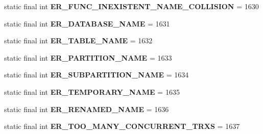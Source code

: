 \begin{DoxyCompactItemize}
static final int {\bfseries E\+R\+\_\+\+F\+U\+N\+C\+\_\+\+I\+N\+E\+X\+I\+S\+T\+E\+N\+T\+\_\+\+N\+A\+M\+E\+\_\+\+C\+O\+L\+L\+I\+S\+I\+ON} = 1630
\item 
\mbox{\label{classcom_1_1mysql_1_1jdbc_1_1_mysql_error_numbers_a9f1bcb88cc56b06b8d9763a1077769a8}} 
static final int {\bfseries E\+R\+\_\+\+D\+A\+T\+A\+B\+A\+S\+E\+\_\+\+N\+A\+ME} = 1631
\item 
\mbox{\label{classcom_1_1mysql_1_1jdbc_1_1_mysql_error_numbers_a16a121e901da7a10cd01977d62ab4933}} 
static final int {\bfseries E\+R\+\_\+\+T\+A\+B\+L\+E\+\_\+\+N\+A\+ME} = 1632
\item 
\mbox{\label{classcom_1_1mysql_1_1jdbc_1_1_mysql_error_numbers_a2ef270c5aaceaf34d9b30d49515d7225}} 
static final int {\bfseries E\+R\+\_\+\+P\+A\+R\+T\+I\+T\+I\+O\+N\+\_\+\+N\+A\+ME} = 1633
\item 
\mbox{\label{classcom_1_1mysql_1_1jdbc_1_1_mysql_error_numbers_a69b8ef0760b472c05bf27df6fd0efb00}} 
static final int {\bfseries E\+R\+\_\+\+S\+U\+B\+P\+A\+R\+T\+I\+T\+I\+O\+N\+\_\+\+N\+A\+ME} = 1634
\item 
\mbox{\label{classcom_1_1mysql_1_1jdbc_1_1_mysql_error_numbers_a904588f287d5396a6efe085c0009eed2}} 
static final int {\bfseries E\+R\+\_\+\+T\+E\+M\+P\+O\+R\+A\+R\+Y\+\_\+\+N\+A\+ME} = 1635
\item 
\mbox{\label{classcom_1_1mysql_1_1jdbc_1_1_mysql_error_numbers_aac9148b758819acfe941e71d1dfa5218}} 
static final int {\bfseries E\+R\+\_\+\+R\+E\+N\+A\+M\+E\+D\+\_\+\+N\+A\+ME} = 1636
\item 
\mbox{\label{classcom_1_1mysql_1_1jdbc_1_1_mysql_error_numbers_ae9db6073bd9cef4cb32c88821c7ad439}} 
static final int {\bfseries E\+R\+\_\+\+T\+O\+O\+\_\+\+M\+A\+N\+Y\+\_\+\+C\+O\+N\+C\+U\+R\+R\+E\+N\+T\+\_\+\+T\+R\+XS} = 1637
\item 
\mbox{\label{classcom_1_1mysql_1_1jdbc_1_1_mysql_error_numbers_ad410bca9bb03c0faab3d6b10cb944dcd}} 

\end{DoxyCompactItemize}

